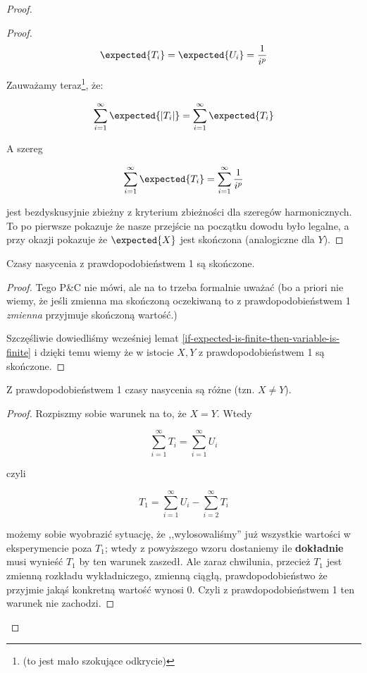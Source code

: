 \begin{proof}
\begin{proof}
		\[
			\expected{T_i} = \expected{U_i} = \frac{1}{i^p}
		\]

		Zauważamy teraz\footnote{(to jest mało szokujące odkrycie)}, że:

		\[
			\sum_{i=1}^{\infty} \expected{|T_i| } =  \sum_{i=1}^{\infty} \expected{T_i}
		\]

		A szereg

		\[
			\sum_{i=1}^{\infty} \expected{T_i} = \sum_{i=1}^{\infty} \frac{1}{i^p}
		\]

		jest bezdyskusyjnie zbieżny z kryterium zbieżności dla szeregów harmonicznych. To po pierwsze pokazuje że nasze przejście na początku dowodu było legalne, a przy okazji pokazuje że \( \expected{X}\) jest skończona (analogiczne dla \(Y\)).

	\end{proof}

	\begin{lemma}
		Czasy nasycenia z prawdopodobieństwem 1 są skończone.
	\end{lemma}
	\begin{proof}
		Tego P\&C nie mówi, ale na to trzeba formalnie uważać (bo a priori nie wiemy, że jeśli zmienna ma skończoną oczekiwaną to z prawdopodobieństwem 1 \textit{zmienna} przyjmuje skończoną wartość.)

		Szczęśliwie dowiedliśmy wcześniej lemat \ref{if-expected-is-finite-then-variable-is-finite} i dzięki temu wiemy że w istocie \(X, Y\) z prawdopodobieństwem 1 są skończone.
	\end{proof}

	\begin{lemma}
		Z prawdopodobieństwem 1 czasy nasycenia są różne (tzn. \(X \not = Y\)).
	\end{lemma}
	\begin{proof}
		Rozpiszmy sobie warunek na to, że \(X = Y\). Wtedy

		\[
			\sum_{i=1}^{\infty} T_i = \sum_{i=1}^{\infty} U_i
		\]

		czyli

		\[
			T_1 = \sum_{i=1}^{\infty} U_i - \sum_{i=2}^{\infty} T_i
		\]

		możemy sobie wyobrazić sytuację, że ,,wylosowaliśmy'' już wszystkie wartości w eksperymencie poza \(T_1\); wtedy z powyższego wzoru dostaniemy ile \textbf{dokładnie} musi wynieść \(T_1\) by ten warunek zaszedł. Ale zaraz chwilunia, przecież \(T_1\) jest zmienną rozkładu wykładniczego, zmienną ciągłą, prawdopodobieństwo że przyjmie jakąś konkretną wartość wynosi 0. Czyli z prawdopodobieństwem 1 ten warunek nie zachodzi.
	\end{proof}




\end{proof}
